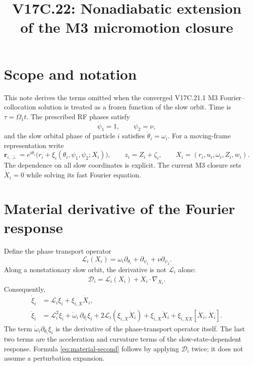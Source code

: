 \documentclass[11pt]{article}
\title{V17C.22: Nonadiabatic extension of the M3 micromotion closure}
\author{}
\date{}
\begin{document}
\maketitle

\section{Scope and notation}
This note derives the terms omitted when the converged V17C.21.1 M3
Fourier--collocation solution is treated as a frozen function of the slow
orbit.  Time is $\tau=\Omega_1 t$.  The prescribed RF phases satisfy
\begin{equation}
 \dot\psi_1=1,\qquad \dot\psi_2=\nu,
\end{equation}
and the slow orbital phase of particle $i$ satisfies $\dot\theta_i=\omega_i$.
For a moving-frame representation write
\begin{equation}
 \mathbf r_{i,\perp}=e^{i\theta_i}\bigl(r_i+\xi_i(\theta_i,\psi_1,\psi_2;X_i)\bigr),
 \qquad z_i=Z_i+\zeta_i,
 \qquad X_i=(r_i,u_i,\omega_i,Z_i,w_i).
\end{equation}
The dependence on all slow coordinates is explicit.  The current M3 closure
sets $\dot X_i=0$ while solving its fast Fourier equation.

\section{Material derivative of the Fourier response}
Define the phase transport operator
\begin{equation}
 \mathcal L_i(X_i)=\omega_i\partial_{\theta_i}
                 +\partial_{\psi_1}+\nu\partial_{\psi_2}.
\end{equation}
Along a nonstationary slow orbit, the derivative is not $\mathcal L_i$ alone:
\begin{equation}
 \mathcal D_i=\mathcal L_i(X_i)+\dot X_i\cdot\nabla_{X_i}.
\end{equation}
Consequently,
\begin{align}
 \dot\xi_i&=\mathcal L_i\xi_i+\xi_{i,X}\dot X_i,\\
 \ddot\xi_i&=\mathcal L_i^2\xi_i
 +\dot\omega_i\,\partial_{\theta_i}\xi_i
 +2\mathcal L_i(\xi_{i,X}\dot X_i)
 +\xi_{i,X}\ddot X_i
 +\xi_{i,XX}[\dot X_i,\dot X_i].
 \label{eq:material-second}
\end{align}
The term $\dot\omega_i\partial_{\theta_i}\xi_i$ is the derivative of the
phase-transport operator itself.  The last two terms are the acceleration
and curvature terms of the slow-state-dependent response.  Formula
\eqref{eq:material-second} follows by applying $\mathcal D_i$ twice; it does
not assume a perturbation expansion.
\end{document}
